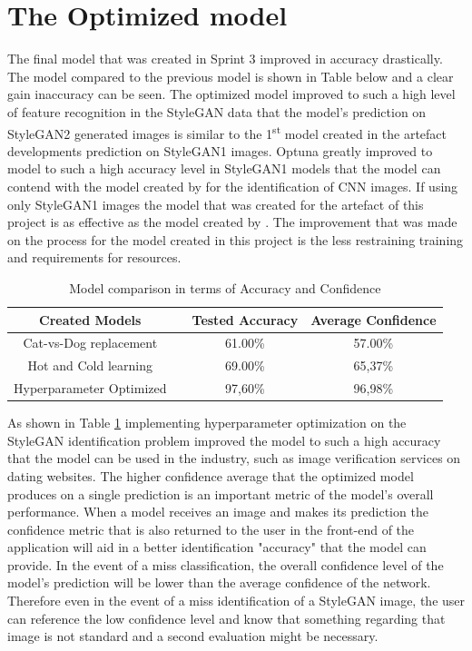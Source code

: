 \section{The Optimized model}

The final model that was created in Sprint 3 improved in accuracy drastically. The model compared to the previous model is shown in Table below and a clear gain inaccuracy can be seen. The optimized model improved to such a high level of feature recognition in the StyleGAN data that the model's prediction on StyleGAN2 generated images is similar to the 1\textsuperscript{st} model created in the artefact developments prediction on StyleGAN1 images. Optuna greatly improved to model to such a high accuracy level in StyleGAN1 models that the model can contend with the model created by \cite{Wang} for the identification of CNN images. If using only StyleGAN1 images the model that was created for the artefact of this project is as effective as the model created by \cite{Wang}. The improvement that was made on the process for the model created in this project is the less restraining training and requirements for resources.

\begin{table}[H]%
\caption{Model comparison in terms of Accuracy and Confidence}
\label{tabl:res2}
\centering
\large
\begin{tabular}{cccc}
\hline
Created Models & & Tested Accuracy  & Average Confidence\\ 
\hline
Cat-vs-Dog replacement & & 61.00\% & 57.00\%\\
Hot and Cold learning & & 69.00\% & 65,37\%\\
Hyperparameter Optimized & & 97,60\% & 96,98\%\\
\hline
\end{tabular}

\end{table} 


As shown in Table \ref{tabl:res2} implementing hyperparameter optimization on the StyleGAN identification problem improved the model to such a high accuracy that the model can be used in the industry, such as image verification services on dating websites. The higher confidence average that the optimized model produces on a single prediction is an important metric of the model's overall performance. When a model receives an image and makes its prediction the confidence metric that is also returned to the user in the front-end of the application will aid in a better identification "accuracy" that the model can provide. In the event of a miss classification, the overall confidence level of the model's prediction will be lower than the average confidence of the network. Therefore even in the event of a miss identification of a StyleGAN image, the user can reference the low confidence level and know that something regarding that image is not standard and a second evaluation might be necessary.

